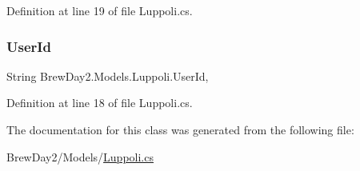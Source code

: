 Definition at line 19 of file Luppoli.\+cs.

\mbox{\label{class_brew_day2_1_1_models_1_1_luppoli_aff73c52523e0a6aae8cd983ad7955426}} 
\subsubsection{\texorpdfstring{User\+Id}{UserId}}
{\footnotesize\ttfamily String Brew\+Day2.\+Models.\+Luppoli.\+User\+Id\hspace{0.3cm}{\ttfamily [get]}, {\ttfamily [set]}}



Definition at line 18 of file Luppoli.\+cs.



The documentation for this class was generated from the following file\+:\begin{DoxyCompactItemize}
\item 
Brew\+Day2/\+Models/\mbox{\hyperlink{_luppoli_8cs}{Luppoli.\+cs}}\end{DoxyCompactItemize}
